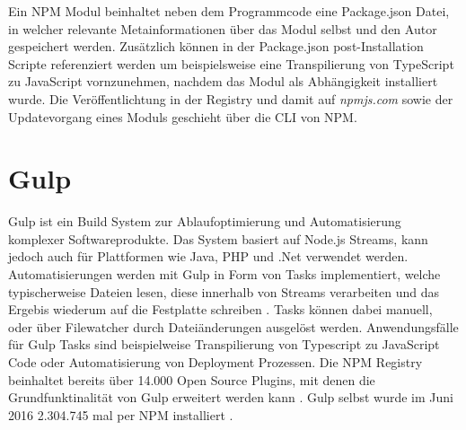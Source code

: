 Ein \ac{NPM} Modul beinhaltet neben dem Programmcode eine Package.json Datei, in welcher relevante Metainformationen über das Modul selbst und den Autor gespeichert werden.
Zusätzlich können in der Package.json post-Installation Scripte referenziert werden um
beispielsweise eine Transpilierung von TypeScript zu JavaScript vornzunehmen, nachdem das Modul als Abhängigkeit installiert wurde.
Die Veröffentlichtung in der Registry und damit auf \emph{npmjs.com} sowie der Updatevorgang eines Moduls geschieht über die \ac{CLI} von \ac{NPM}.

\section{Gulp}

Gulp ist ein Build System zur Ablaufoptimierung und Automatisierung komplexer Softwareprodukte.
Das System basiert auf Node.js Streams, kann jedoch auch für Plattformen wie Java, PHP und .Net verwendet werden.
Automatisierungen werden mit Gulp in Form von Tasks implementiert,
welche typischerweise Dateien lesen, diese innerhalb von Streams verarbeiten und das Ergebis wiederum auf die
Festplatte schreiben \cite{gulpj46:online}.
Tasks können dabei manuell, oder über Filewatcher durch Dateiänderungen ausgelöst werden.
Anwendungsfälle für Gulp Tasks sind beispielweise Transpilierung von Typescript zu JavaScript Code oder
Automatisierung von Deployment Prozessen. Die \ac{NPM} Registry beinhaltet bereits über 14.000 Open Source Plugins,
mit denen die Grundfunktinalität von Gulp erweitert werden kann \cite{resul14:online}.
Gulp selbst wurde im Juni 2016 2.304.745 mal per NPM installiert \cite{gulp17:online}.
